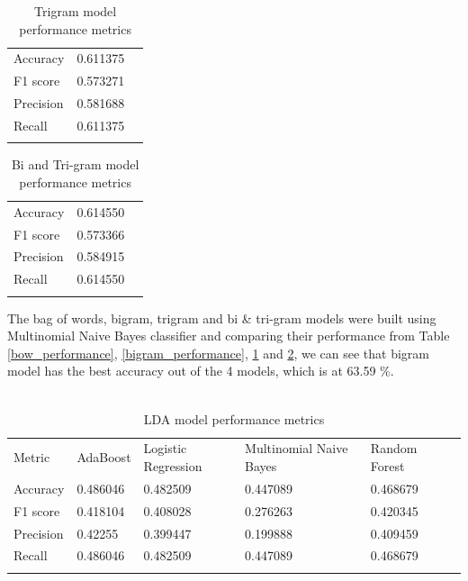\documentclass[paper=a4, fontsize=11pt]{scrartcl} %
\numberwithin{equation}{section} %
\numberwithin{figure}{section} %
\numberwithin{table}{section} %
\begin{document}
\begin{table}[!htb]
 \centering
 \caption{Trigram model performance metrics}
 \label{trigram_performance}
 \begin{tabular}{l l l} 
    \noalign{\smallskip}\hline\noalign{\smallskip}
    Accuracy & 0.611375\\
    F1 score & 0.573271\\
    Precision & 0.581688\\
    Recall & 0.611375\\
    \noalign{\smallskip}\hline
  \end{tabular} 
\end{table}  

\begin{table}[!htb]
 \centering
 \caption{Bi and Tri-gram model performance metrics}
 \label{biandtri_performance}
 \begin{tabular}{l l l} 
    \noalign{\smallskip}\hline\noalign{\smallskip}
    Accuracy & 0.614550\\
    F1 score & 0.573366\\
    Precision & 0.584915\\
    Recall & 0.614550\\
    \noalign{\smallskip}\hline
  \end{tabular} 
\end{table}  

The bag of words, bigram, trigram and bi \& tri-gram models were built using Multinomial Naive Bayes classifier and comparing their performance from Table \ref{bow_performance}, \ref{bigram_performance}, \ref{trigram_performance} and \ref{biandtri_performance}, we can see that bigram model has the best accuracy out of the 4 models, which is at 63.59 \%.\\\\

\begin{table}[!htb]
 \centering
 \caption{LDA model performance metrics}
 \label{lda_performance}
 \begin{tabular}{l l l l l l} 
    \noalign{\smallskip}\hline\noalign{\smallskip}
    Metric & AdaBoost & Logistic Regression & \multicolumn{1}{p{3cm}}{Multinomial Naive Bayes} & Random Forest\\
    \noalign{\smallskip}\hline\noalign{\smallskip}
    Accuracy & 0.486046	&0.482509	&0.447089	&0.468679\\
    F1 score & 0.418104	&0.408028	&0.276263	&0.420345\\
    Precision & 	0.42255	&0.399447	&0.199888	&0.409459\\
    Recall & 	0.486046	&0.482509	&0.447089	&0.468679\\
    \noalign{\smallskip}\hline
  \end{tabular}
\end{table}  
\end{document}

